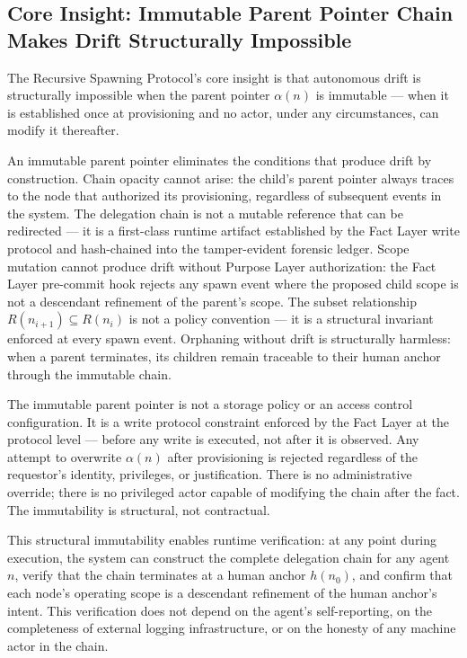 \documentclass[12pt]{article}
\begin{document}
\subsection{Core Insight: Immutable Parent Pointer Chain Makes Drift Structurally Impossible}

The Recursive Spawning Protocol's core insight is that autonomous drift is structurally impossible when the parent pointer $\alpha(n)$ is immutable --- when it is established once at provisioning and no actor, under any circumstances, can modify it thereafter.

An immutable parent pointer eliminates the conditions that produce drift by construction. Chain opacity cannot arise: the child's parent pointer always traces to the node that authorized its provisioning, regardless of subsequent events in the system. The delegation chain is not a mutable reference that can be redirected --- it is a first-class runtime artifact established by the Fact Layer write protocol and hash-chained into the tamper-evident forensic ledger. Scope mutation cannot produce drift without Purpose Layer authorization: the Fact Layer pre-commit hook rejects any spawn event where the proposed child scope is not a descendant refinement of the parent's scope. The subset relationship $R(n_{i+1}) \subseteq R(n_i)$ is not a policy convention --- it is a structural invariant enforced at every spawn event. Orphaning without drift is structurally harmless: when a parent terminates, its children remain traceable to their human anchor through the immutable chain.

The immutable parent pointer is not a storage policy or an access control configuration. It is a write protocol constraint enforced by the Fact Layer at the protocol level --- before any write is executed, not after it is observed. Any attempt to overwrite $\alpha(n)$ after provisioning is rejected regardless of the requestor's identity, privileges, or justification. There is no administrative override; there is no privileged actor capable of modifying the chain after the fact. The immutability is structural, not contractual.

This structural immutability enables runtime verification: at any point during execution, the system can construct the complete delegation chain for any agent $n$, verify that the chain terminates at a human anchor $h(n_0)$, and confirm that each node's operating scope is a descendant refinement of the human anchor's intent. This verification does not depend on the agent's self-reporting, on the completeness of external logging infrastructure, or on the honesty of any machine actor in the chain.
\end{document}
